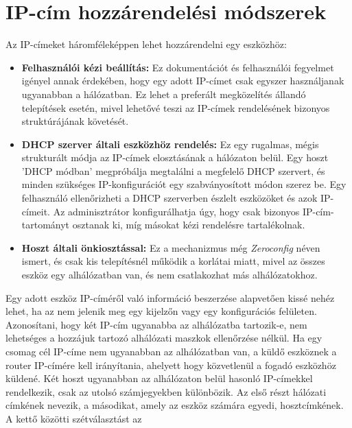 \section{IP-cím hozzárendelési módszerek~\cite{AHNERT2023}}
Az IP-címeket háromféleképpen lehet hozzárendelni egy eszközhöz:
\begin{itemize}
    \item \textbf{Felhasználói kézi beállítás:}
    Ez dokumentációt és felhasználói fegyelmet igényel annak érdekében,
	hogy egy adott IP-címet csak egyszer használjanak ugyanabban a hálózatban.
	Ez lehet a preferált megközelítés állandó telepítések esetén,
	mivel lehetővé teszi az IP-címek rendelésének bizonyos struktúrájának követését.
    
    \item \textbf{DHCP szerver általi eszközhöz rendelés:}
    Ez egy rugalmas, mégis strukturált módja az IP-címek elosztásának a hálózaton belül.
	Egy hoszt 'DHCP módban' megpróbálja megtalálni a megfelelő DHCP szervert,
	és minden szükséges IP-konfigurációt egy szabványosított módon szerez be.
	Egy felhasználó ellenőrizheti a DHCP szerverben észlelt eszközöket és azok IP-címeit.
	Az adminisztrátor konfigurálhatja úgy, hogy csak bizonyos IP-cím-tartományt osztanak ki,
	míg másokat kézi rendelésre tartalékolnak.
    
    \item \textbf{Hoszt általi önkiosztással:}
    Ez a mechanizmus még \textit{Zeroconfig} néven ismert, és csak kis telepítésnél
	működik a korlátai miatt, mivel az összes eszköz egy alhálózatban van,
	és nem csatlakozhat más alhálózatokhoz.
\end{itemize}
Egy adott eszköz IP-címéről való információ beszerzése alapvetően kissé nehéz lehet,
ha az nem jelenik meg egy kijelzőn vagy egy konfigurációs felületen.
Azonosítani, hogy két IP-cím ugyanabba az alhálózatba tartozik-e, nem lehetséges 
a hozzájuk tartozó alhálózati maszkok ellenőrzése nélkül.
Ha egy csomag cél IP-címe nem ugyanabban az alhálózatban van,
a küldő eszköznek a router IP-címére kell irányítania, ahelyett hogy
közvetlenül a fogadó eszközhöz küldené. 
Két hoszt ugyanabban az alhálózaton belül hasonló IP-címekkel rendelkezik, csak az utolsó számjegyekben
különbözik. Az első részt hálózati címkének nevezik, a másodikat, amely az
eszköz számára egyedi, hosztcímkének. A kettő közötti szétválasztást az
